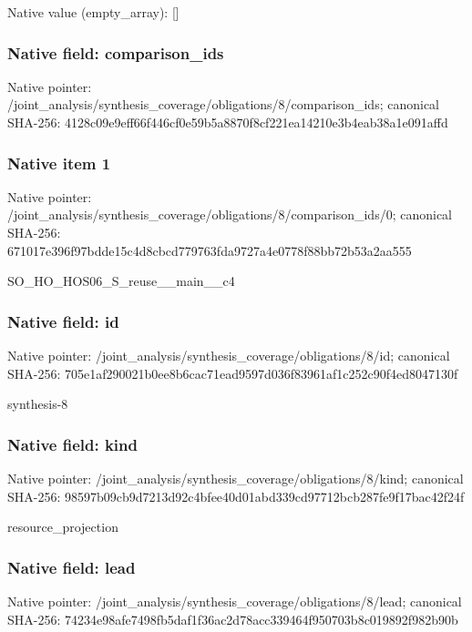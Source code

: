 \documentclass[10pt,a4paper]{article}
\begin{document}
Native value (empty\_\allowbreak{}array): []

\subsubsection{Native field: comparison\_\allowbreak{}ids}
Native pointer: /joint\_\allowbreak{}analysis/synthesis\_\allowbreak{}coverage/obligations/8/comparison\_\allowbreak{}ids; canonical SHA-256: 4128c09e9eff66f446cf0e59b5a8870f8cf221ea14210e3b4eab38a1e091affd

\subsubsection{Native item 1}
Native pointer: /joint\_\allowbreak{}analysis/synthesis\_\allowbreak{}coverage/obligations/8/comparison\_\allowbreak{}ids/0; canonical SHA-256: 671017e396f97bdde15c4d8cbcd779763fda9727a4e0778f88bb72b53a2aa555

\begingroup\raggedright\sloppy SO\_\allowbreak{}HO\_\allowbreak{}HOS06\_\allowbreak{}S\_\allowbreak{}reuse\_\allowbreak{}\_\allowbreak{}main\_\allowbreak{}\_\allowbreak{}c4\par\endgroup

\subsubsection{Native field: id}
Native pointer: /joint\_\allowbreak{}analysis/synthesis\_\allowbreak{}coverage/obligations/8/id; canonical SHA-256: 705e1af290021b0ee8b6cac71ead9597d036f83961af1c252c90f4ed8047130f

\begingroup\raggedright\sloppy synthesis-8\par\endgroup

\subsubsection{Native field: kind}
Native pointer: /joint\_\allowbreak{}analysis/synthesis\_\allowbreak{}coverage/obligations/8/kind; canonical SHA-256: 98597b09cb9d7213d92c4bfee40d01abd339cd97712bcb287fe9f17bac42f24f

\begingroup\raggedright\sloppy resource\_\allowbreak{}projection\par\endgroup

\subsubsection{Native field: lead}
Native pointer: /joint\_\allowbreak{}analysis/synthesis\_\allowbreak{}coverage/obligations/8/lead; canonical SHA-256: 74234e98afe7498fb5daf1f36ac2d78acc339464f950703b8c019892f982b90b
\end{document}
